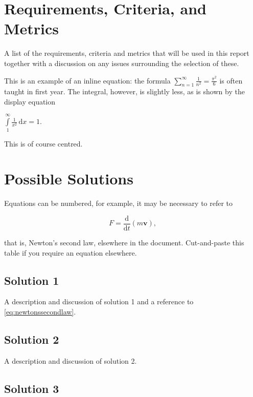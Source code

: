 \documentclass{wkrpt}
\begin{document}
\section{Requirements, Criteria, and Metrics}

\label{sec:rcm} %

A list of the requirements, criteria and metrics that will be used in this report together with a discussion on any issues surrounding the selection of these.

This is an example of an inline equation: the formula $\sum_{n=1}^{\infty}\frac{1}{n^2}=\frac{\pi^{2}}{6}$ is often taught in first year.  The integral, however, is slightly less, as is shown by the display equation

\begin{center}
    $\int\limits_{1}^{\infty}\frac{1}{x^{2}}\, \mathrm{d}x=1$.
\end{center}

This is of course centred.

\section{Possible Solutions}

Equations can be numbered, for example, it may be necessary to refer to

\begin{equation}
    \label{eq:newtonssecondlaw}
    F=\frac{\mathrm{d}}{\mathrm{d}t}(m\mathbf{v}),
\end{equation}

that is, Newton\textquoteright s second law, elsewhere in the document.  Cut-and-paste this table if you require an equation elsewhere.

\subsection{Solution 1}

A description and discussion of solution 1 and a reference to \cref{eq:newtonssecondlaw}.

\subsection{Solution 2}

A description and discussion of solution 2.

\subsection{Solution 3}
\end{document}
